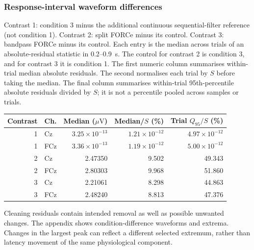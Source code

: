 \documentclass[11pt,a4paper]{article}
\newcommand{\uv}{\ensuremath{\mu\mathrm{V}}}
\begin{document}
\subsubsection{Response-interval waveform differences}
Contrast 1: condition 3 minus the additional continuous sequential-filter reference (not condition 1). Contrast 2: split FORCe minus its control. Contrast 3: bandpass FORCe minus its control. Each entry is the median across trials of an absolute-residual statistic in 0.2--0.9~s. The control for contrast 2 is condition 3, and for contrast 3 it is condition 1. The first numeric column summarises within-trial median absolute residuals. The second normalises each trial by $S$ before taking the median. The final column summarises within-trial 95th-percentile absolute residuals divided by $S$; it is not a percentile pooled across samples or trials.
\begin{center}\small\begin{tabular}{rlrrr}\toprule
Contrast & Ch. & Median (\uv) & Median/$S$ (\%) & Trial $Q_{95}/S$ (\%) \\
\midrule
1 & Cz & $3.25\times10^{-13}$ & $1.21\times10^{-12}$ & $4.97\times10^{-12}$ \\
1 & FCz & $3.36\times10^{-13}$ & $1.19\times10^{-12}$ & $5.00\times10^{-12}$ \\
2 & Cz & 2.47350 & 9.502 & 49.343 \\
2 & FCz & 2.80303 & 9.968 & 51.860 \\
3 & Cz & 2.21061 & 8.298 & 44.863 \\
3 & FCz & 2.48240 & 8.813 & 47.376 \\
\bottomrule\end{tabular}\end{center}
Cleaning residuals contain intended removal as well as possible unwanted changes. The appendix shows condition-difference waveforms and extrema. Changes in the largest peak can reflect a different selected extremum, rather than latency movement of the same physiological component.
\end{document}
